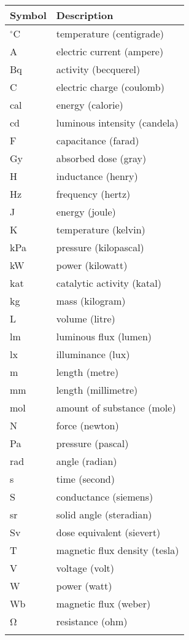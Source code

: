 \documentclass[12pt]{article}
\begin{document}
\begin{longtable*}{l l}
\toprule
Symbol & Description
\\
\midrule
${}^{\circ}$C & temperature (centigrade)
\\
A & electric current (ampere)
\\
Bq & activity (becquerel)
\\
C & electric charge (coulomb)
\\
cal & energy (calorie)
\\
cd & luminous intensity (candela)
\\
F & capacitance (farad)
\\
Gy & absorbed dose (gray)
\\
H & inductance (henry)
\\
Hz & frequency (hertz)
\\
J & energy (joule)
\\
K & temperature (kelvin)
\\
kPa & pressure (kilopascal)
\\
kW & power (kilowatt)
\\
kat & catalytic activity (katal)
\\
kg & mass (kilogram)
\\
L & volume (litre)
\\
lm & luminous flux (lumen)
\\
lx & illuminance (lux)
\\
m & length (metre)
\\
mm & length (millimetre)
\\
mol & amount of substance (mole)
\\
N & force (newton)
\\
Pa & pressure (pascal)
\\
rad & angle (radian)
\\
s & time (second)
\\
S & conductance (siemens)
\\
sr & solid angle (steradian)
\\
Sv & dose equivalent (sievert)
\\
T & magnetic flux density (tesla)
\\
V & voltage (volt)
\\
W & power (watt)
\\
Wb & magnetic flux (weber)
\\
Ω & resistance (ohm)
\\
\bottomrule
\label{Table:ToU}
\end{longtable*}
\end{document}
